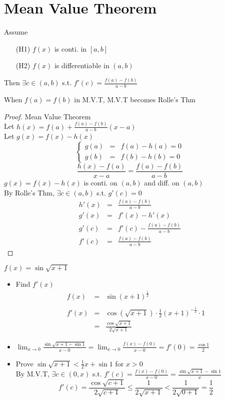 \section{Mean Value Theorem}
\begin{theorem}
Assume
\begin{itemize}
\item[(H1)] $f(x)$ is conti. in $[a, b]$
\item[(H2)] $f(x)$ is differentiable in $(a, b)$
\end{itemize}
Then $\exists c \in (a, b)$ s.t. $\displaystyle f'(c) = \frac{f(a)-f(b)}{a-b}$
\end{theorem}
\begin{remark}
When $f(a) = f(b)$ in M.V.T, M.V.T becomes Rolle's Thm
\end{remark}
\begin{proof} Mean Value Theorem\\
Let $\displaystyle h(x) = f(a) + \frac{f(a) -f(b)}{a-b} (x-a)$\\
Let $g(x) = f(x) - h(x)$\\
$$\left\{ \begin{array}{rcl}
g(a) & = & f(a) - h(a) = 0\\
g(b) & = & f(b) - h(b) = 0
\end{array}
\right.
$$
$$\displaystyle \frac{h(x) - f(a)}{x-a} = \frac{f(a) - f(b)}{a-b}$$
$g(x) = f(x) - h(x)$ is conti. on $(a,b)$ and diff. on $(a, b)$\\
By Rolle's Thm, $\exists c \in (a, b)$ s.t. $g'(c) = 0$\\
$$\begin{array}{rcl}
h'(x) & = & \displaystyle \frac{f(a) - f(b)}{a-b}\\
g'(x) & = & f'(x) - h'(x)\\
g'(c) & = & \displaystyle f'(c) - \frac{f(a) - f(b)}{a-b}\\
f'(c) & = & \displaystyle \frac{f(a) - f(b)}{a-b}
\end{array}$$
\end{proof}
\begin{eg}
$f(x) = \sin \sqrt{x+1}$
\begin{itemize}
\item Find $f'(x)$
$$\begin{array}{rcl}
f(x) & = & \sin (x+1)^\frac{1}{2}\\\\
f'(x) & = & \displaystyle \cos(\sqrt{x+1}) \cdot \frac{1}{2}(x+1)^{-\frac{1}{2}} \cdot 1\\
& = & \displaystyle \frac{\cos \sqrt{x+1}}{2\sqrt{x+1}}
\end{array}$$
\item 
$\displaystyle \lim_{x \to 0} \frac{\sin \sqrt{x+1 - \sin 1}}{x-0} = \lim_{x \to 0} \frac{f(x) -f(0)}{x-0} = f'(0) = \frac{\cos 1}{2}$
\item Prove $\displaystyle \sin \sqrt{x+1} < \frac{1}{2}x + \sin 1$ for $x>0$\\
By M.V.T, $\exists c \in (0, x)$ s.t. $\displaystyle f'(c) = \frac{f(x) - f(0)}{x-0} = \frac{\sin \sqrt{x+1} - \sin 1}{x}$
$$\displaystyle f'(c) = \frac{\cos \sqrt{c+1}}{2\sqrt{c+1}} \leq \frac{1}{2\sqrt{x+1}} < \frac{1}{2\sqrt{0+1}} = \frac{1}{2}$$
\end{itemize}
\end{eg}
